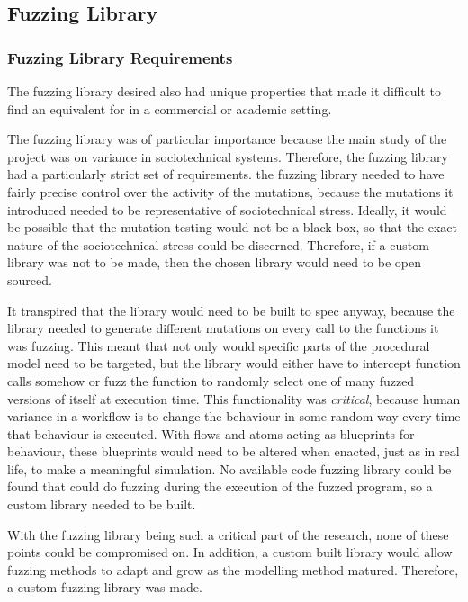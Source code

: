 \subsection{Fuzzing Library}\label{planning_fuzzing}
\subsubsection{Fuzzing Library Requirements}\label{planning_fuzzing_requirements}
The fuzzing library desired also had unique properties that made it difficult to find an equivalent for in a commercial or academic setting. \par
The fuzzing library was of particular importance because the main study of the project was on variance in sociotechnical systems. Therefore, the fuzzing library had a particularly strict set of requirements. the fuzzing library needed to have fairly precise control over the activity of the mutations, because the mutations it introduced needed to be representative of sociotechnical stress. Ideally, it would be possible that the mutation testing would not be a black box, so that the exact nature of the sociotechnical stress could be discerned. Therefore, if a custom library was not to be made, then the chosen library would need to be open sourced. \par
It transpired that the library would need to be built to spec anyway, because the library needed to generate different mutations on every call to the functions it was fuzzing. This meant that not only would specific parts of the procedural model need to be targeted, but the library would either have to intercept function calls somehow or fuzz the function to randomly select one of many fuzzed versions of itself at execution time. This functionality was \emph{critical}, because human variance in a workflow is to change the behaviour in some random way every time that behaviour is executed. With flows and atoms acting as blueprints for behaviour, these blueprints would need to be altered when enacted, just as in real life, to make a meaningful simulation. No available code fuzzing library could be found that could do fuzzing during the execution of the fuzzed program, so a custom library needed to be built. \par
With the fuzzing library being such a critical part of the research, none of these points could be compromised on. In addition, a custom built library would allow fuzzing methods to adapt and grow as the modelling method matured. Therefore, a custom fuzzing library was made. \par

